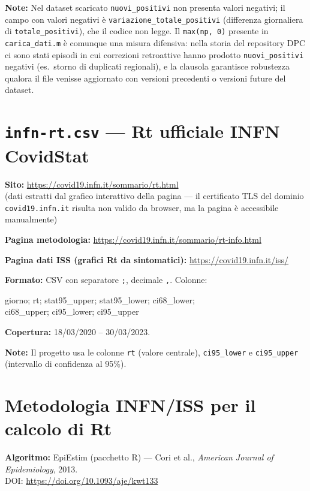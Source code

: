 \documentclass[12pt, a4paper]{article}
\begin{document}
\textbf{Note:} Nel dataset scaricato \texttt{nuovi\_positivi} non presenta
valori negativi; il campo con valori negativi è
\texttt{variazione\_totale\_positivi} (differenza giornaliera di
\texttt{totale\_positivi}), che il codice non legge. Il \texttt{max(np, 0)}
presente in \texttt{carica\_dati.m} è comunque una misura difensiva: nella
storia del repository DPC ci sono stati episodi in cui correzioni retroattive
hanno prodotto \texttt{nuovi\_positivi} negativi (es.\ storno di duplicati
regionali), e la clausola garantisce robustezza qualora il file venisse
aggiornato con versioni precedenti o versioni future del dataset.

\section{\texttt{infn-rt.csv} — Rt ufficiale INFN CovidStat}

\textbf{Sito:} \url{https://covid19.infn.it/sommario/rt.html}\\
(dati estratti dal grafico interattivo della pagina — il certificato TLS del
dominio \texttt{covid19.infn.it} risulta non valido da browser, ma la pagina è
accessibile manualmente)

\textbf{Pagina metodologia:} \url{https://covid19.infn.it/sommario/rt-info.html}

\textbf{Pagina dati ISS (grafici Rt da sintomatici):}
\url{https://covid19.infn.it/iss/}

\textbf{Formato:} CSV con separatore \texttt{;}, decimale \texttt{,}. Colonne:
\begin{center}
{\small\ttfamily
giorno; rt; stat95\_upper; stat95\_lower; ci68\_lower;\\[2pt]
ci68\_upper; ci95\_lower; ci95\_upper}
\end{center}

\textbf{Copertura:} 18/03/2020 – 30/03/2023.

\textbf{Note:} Il progetto usa le colonne \texttt{rt} (valore centrale),
\texttt{ci95\_lower} e \texttt{ci95\_upper} (intervallo di confidenza al 95\%).

\section{Metodologia INFN/ISS per il calcolo di Rt}

\textbf{Algoritmo:} EpiEstim (pacchetto R) — Cori et al.,
\textit{American Journal of Epidemiology}, 2013.\\
DOI: \url{https://doi.org/10.1093/aje/kwt133}
\end{document}
